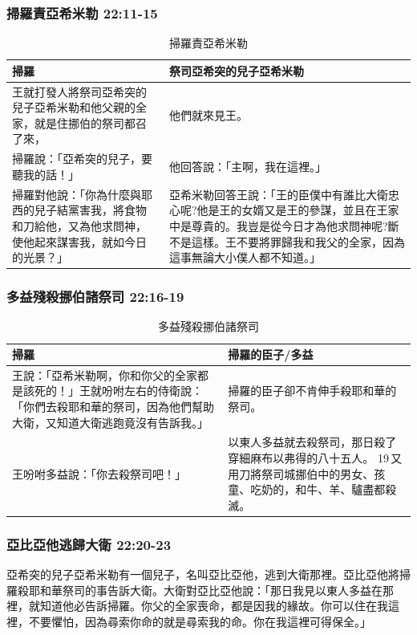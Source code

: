 \subsubsection{掃羅責亞希米勒 22:11-15}
\begin{table}[H]
\centering 
\begin{tabular}{p{6.75cm}|p{11.4cm}}\hline\hline
掃羅&祭司亞希突的兒子亞希米勒\\\hline
王就打發人將祭司亞希突的兒子亞希米勒和他父親的全家，就是住挪伯的祭司都召了來，&他們就來見王。\\\hline
掃羅說：「亞希突的兒子，要聽我的話！」&他回答說：「主啊，我在這裡。」\\\hline
掃羅對他說：「你為什麼與耶西的兒子結黨害我，將食物和刀給他，又為他求問神，使他起來謀害我，就如今日的光景？」 &亞希米勒回答王說：「王的臣僕中有誰比大衛忠心呢?他是王的女婿又是王的參謀，並且在王家中是尊貴的。我豈是從今日才為他求問神呢?斷不是這樣。王不要將罪歸我和我父的全家，因為這事無論大小僕人都不知道。」\\\hline
\end{tabular}
\caption{掃羅責亞希米勒}
\end{table}

\subsubsection{多益殘殺挪伯諸祭司 22:16-19}
\begin{table}[H]
\centering 
\begin{tabular}{p{9.5cm}|p{7.25cm}}\hline\hline
掃羅&掃羅的臣子/多益\\\hline
王說：「亞希米勒啊，你和你父的全家都是該死的！」王就吩咐左右的侍衛說：「你們去殺耶和華的祭司，因為他們幫助大衛，又知道大衛逃跑竟沒有告訴我。」&掃羅的臣子卻不肯伸手殺耶和華的祭司。\\\hline
王吩咐多益說：「你去殺祭司吧！」&以東人多益就去殺祭司，那日殺了穿細麻布以弗得的八十五人。 19 又用刀將祭司城挪伯中的男女、孩童、吃奶的，和牛、羊、驢盡都殺滅。\\\hline
\end{tabular}
\caption{多益殘殺挪伯諸祭司}
\end{table}

\subsubsection{亞比亞他逃歸大衛 22:20-23}
亞希突的兒子亞希米勒有一個兒子，名叫亞比亞他，逃到大衛那裡。亞比亞他將掃羅殺耶和華祭司的事告訴大衛。大衛對亞比亞他說：「那日我見以東人多益在那裡，就知道他必告訴掃羅。你父的全家喪命，都是因我的緣故。你可以住在我這裡，不要懼怕，因為尋索你命的就是尋索我的命。你在我這裡可得保全。」

